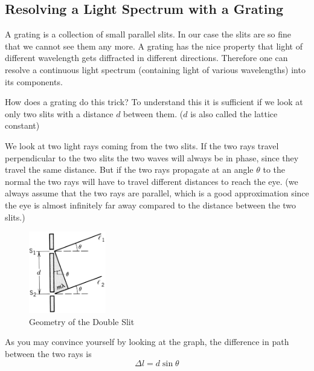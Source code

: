 \subsection{Resolving a Light Spectrum with a Grating}
A grating is a collection of small parallel slits. In our case the slits are so fine that we cannot see them any more. A grating has the nice property that light of different wavelength gets diffracted in different directions. Therefore one can resolve a continuous light spectrum (containing light of various wavelengths) into its components. \myskip

How does a grating do this trick? To understand this it is sufficient if we look at only two slits with a distance $d$ between them. ($d$ is also called the lattice constant)\myskip

We look at two light rays coming from the two slits. If the two rays travel perpendicular to the two slits the two waves will always be in phase, since they travel the same distance. But if the two rays propagate at an angle $\theta$ to the normal the two rays will have to travel different distances to reach the eye. (we always assume that the two rays are parallel, which is a good approximation since the eye is almost infinitely far away compared to the distance between the two slits.)
\begin{figure}[h]
\centering
\includegraphics[width=0.3\textwidth]{./Exp9/pic/image1.png}
\caption{Geometry of the Double Slit}
\label{fig:slit}
\end{figure} 

As you may convince yourself by looking at the graph, the difference in path between the two rays is
\begin{equation}
  \Delta l =d\sin\theta
\end{equation}

